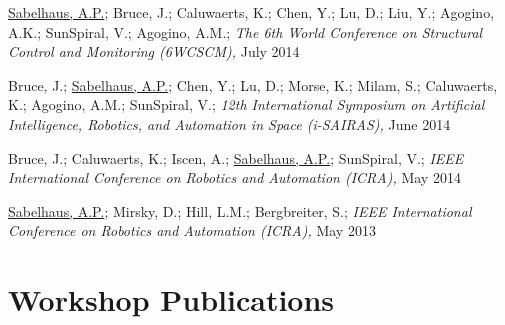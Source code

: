 \documentclass[letterpaper]{deedy-resume} %
\begin{document}
{\begin{etaremune}
\item {} \underline{Sabelhaus, A.P.}; Bruce, J.; Caluwaerts, K.; Chen, Y.; Lu, D.; Liu, Y.; Agogino, A.K.; SunSpiral, V.; Agogino, A.M.; {\it The 6th World Conference on Structural Control and Monitoring (6WCSCM),} July 2014

\item {} Bruce, J.; \underline{Sabelhaus, A.P.}; Chen, Y.; Lu, D.; Morse, K.; Milam, S.; Caluwaerts, K.; Agogino, A.M.; SunSpiral, V.; {\it 12th International Symposium on Artificial Intelligence, Robotics, and Automation in Space (i-SAIRAS),} June 2014

\item {} Bruce, J.; Caluwaerts, K.; Iscen, A.; \underline{Sabelhaus, A.P.}; SunSpiral, V.; {\it IEEE International Conference on Robotics and Automation (ICRA),} May 2014

\item {} \underline{Sabelhaus, A.P.}; Mirsky, D.; Hill, L.M.; Bergbreiter, S.; {\it IEEE International Conference on Robotics and Automation (ICRA),} May 2013


\end{etaremune}








\section{Workshop Publications}

}
\end{document}
